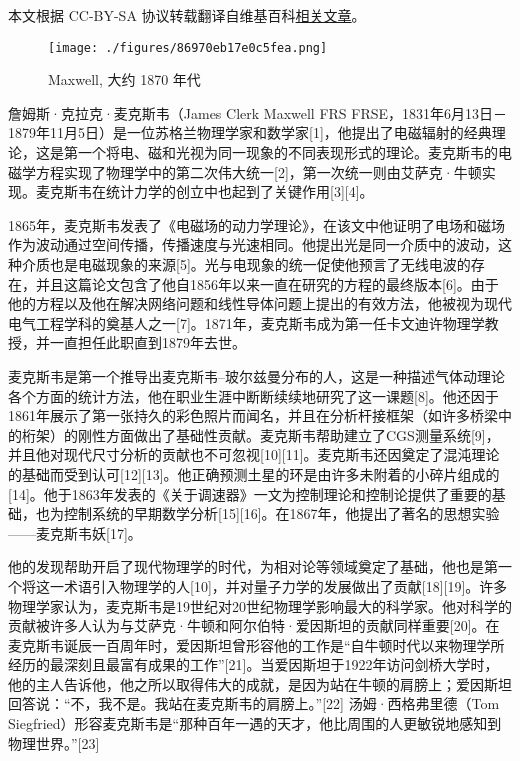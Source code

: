
本文根据 CC-BY-SA 协议转载翻译自维基百科\href{https://en.wikipedia.org/wiki/James_Clerk_Maxwell}{相关文章}。
\begin{figure}[ht]
\centering
\texttt{[image: ./figures/86970eb17e0c5fea.png]}
\caption{Maxwell, 大约 1870 年代} \label{fig_Clerk_1}
\end{figure}
詹姆斯·克拉克·麦克斯韦（James Clerk Maxwell FRS FRSE，1831年6月13日－1879年11月5日）是一位苏格兰物理学家和数学家[1]，他提出了电磁辐射的经典理论，这是第一个将电、磁和光视为同一现象的不同表现形式的理论。麦克斯韦的电磁学方程实现了物理学中的第二次伟大统一[2]，第一次统一则由艾萨克·牛顿实现。麦克斯韦在统计力学的创立中也起到了关键作用[3][4]。

1865年，麦克斯韦发表了《电磁场的动力学理论》，在该文中他证明了电场和磁场作为波动通过空间传播，传播速度与光速相同。他提出光是同一介质中的波动，这种介质也是电磁现象的来源[5]。光与电现象的统一促使他预言了无线电波的存在，并且这篇论文包含了他自1856年以来一直在研究的方程的最终版本[6]。由于他的方程以及他在解决网络问题和线性导体问题上提出的有效方法，他被视为现代电气工程学科的奠基人之一[7]。1871年，麦克斯韦成为第一任卡文迪许物理学教授，并一直担任此职直到1879年去世。

麦克斯韦是第一个推导出麦克斯韦–玻尔兹曼分布的人，这是一种描述气体动理论各个方面的统计方法，他在职业生涯中断断续续地研究了这一课题[8]。他还因于1861年展示了第一张持久的彩色照片而闻名，并且在分析杆接框架（如许多桥梁中的桁架）的刚性方面做出了基础性贡献。麦克斯韦帮助建立了CGS测量系统[9]，并且他对现代尺寸分析的贡献也不可忽视[10][11]。麦克斯韦还因奠定了混沌理论的基础而受到认可[12][13]。他正确预测土星的环是由许多未附着的小碎片组成的[14]。他于1863年发表的《关于调速器》一文为控制理论和控制论提供了重要的基础，也为控制系统的早期数学分析[15][16]。在1867年，他提出了著名的思想实验——麦克斯韦妖[17]。

他的发现帮助开启了现代物理学的时代，为相对论等领域奠定了基础，他也是第一个将这一术语引入物理学的人[10]，并对量子力学的发展做出了贡献[18][19]。许多物理学家认为，麦克斯韦是19世纪对20世纪物理学影响最大的科学家。他对科学的贡献被许多人认为与艾萨克·牛顿和阿尔伯特·爱因斯坦的贡献同样重要[20]。在麦克斯韦诞辰一百周年时，爱因斯坦曾形容他的工作是“自牛顿时代以来物理学所经历的最深刻且最富有成果的工作”[21]。当爱因斯坦于1922年访问剑桥大学时，他的主人告诉他，他之所以取得伟大的成就，是因为站在牛顿的肩膀上；爱因斯坦回答说：“不，我不是。我站在麦克斯韦的肩膀上。”[22] 汤姆·西格弗里德（Tom Siegfried）形容麦克斯韦是“那种百年一遇的天才，他比周围的人更敏锐地感知到物理世界。”[23]
